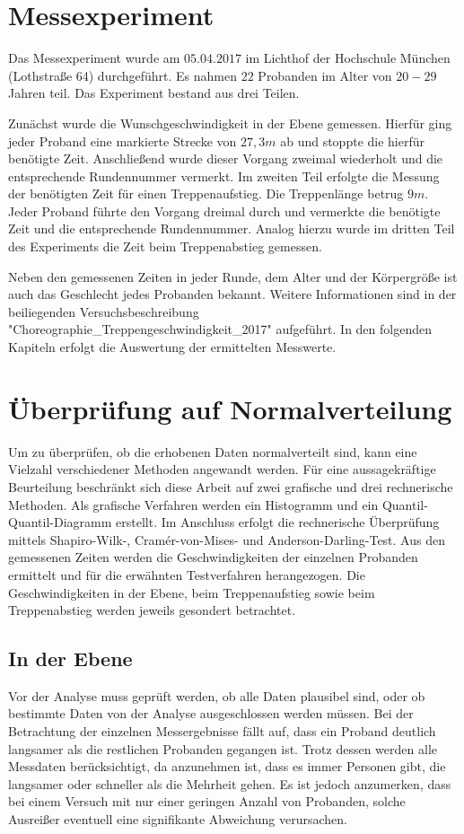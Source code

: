 \section{Messexperiment}

Das Messexperiment wurde am $05.04.2017$ im Lichthof der Hochschule München (Lothstraße 64) durchgeführt. Es nahmen $22$ Probanden im Alter von $20-29$ Jahren teil. Das Experiment bestand aus drei Teilen. 

Zunächst wurde die Wunschgeschwindigkeit in der Ebene gemessen. Hierfür ging jeder Proband eine markierte Strecke von $27,3m$ ab und stoppte die hierfür benötigte Zeit. Anschließend wurde dieser Vorgang zweimal wiederholt und die entsprechende Rundennummer vermerkt. Im zweiten Teil erfolgte die Messung der benötigten Zeit für einen Treppenaufstieg. Die Treppenlänge betrug $9m$. Jeder Proband führte den Vorgang dreimal durch und vermerkte die benötigte Zeit und die entsprechende Rundennummer. Analog hierzu wurde im dritten Teil des Experiments die Zeit beim Treppenabstieg gemessen. 

Neben den gemessenen Zeiten in jeder Runde, dem Alter und der Körpergröße ist auch das Geschlecht jedes Probanden bekannt. Weitere Informationen sind in der beiliegenden Versuchsbeschreibung "Choreographie\_Treppengeschwindigkeit\_2017" aufgeführt. In den folgenden Kapiteln erfolgt die Auswertung der ermittelten Messwerte.

\section{Überprüfung auf Normalverteilung}
Um zu überprüfen, ob die erhobenen Daten normalverteilt sind, kann eine Vielzahl verschiedener Methoden angewandt werden. Für eine aussagekräftige Beurteilung beschränkt sich diese Arbeit auf zwei grafische und drei rechnerische Methoden. Als grafische Verfahren werden ein Histogramm und ein Quantil-Quantil-Diagramm erstellt. Im Anschluss erfolgt die rechnerische Überprüfung mittels Shapiro-Wilk-, Cramér-von-Mises- und Anderson-Darling-Test. Aus den gemessenen Zeiten werden die Geschwindigkeiten der einzelnen Probanden ermittelt und für die erwähnten Testverfahren herangezogen. Die Geschwindigkeiten in der Ebene, beim Treppenaufstieg sowie beim Treppenabstieg werden jeweils gesondert betrachtet.

\subsection{In der Ebene}
Vor der Analyse muss geprüft werden, ob alle Daten plausibel sind, oder ob bestimmte Daten von der Analyse ausgeschlossen werden müssen. Bei der Betrachtung der einzelnen Messergebnisse fällt auf, dass ein Proband deutlich langsamer als die restlichen Probanden gegangen ist. Trotz dessen werden alle Messdaten berücksichtigt, da anzunehmen ist, dass es immer Personen gibt, die langsamer oder schneller als die Mehrheit gehen. Es ist jedoch anzumerken, dass bei einem Versuch mit nur einer geringen Anzahl von Probanden, solche Ausreißer eventuell eine signifikante Abweichung verursachen.

